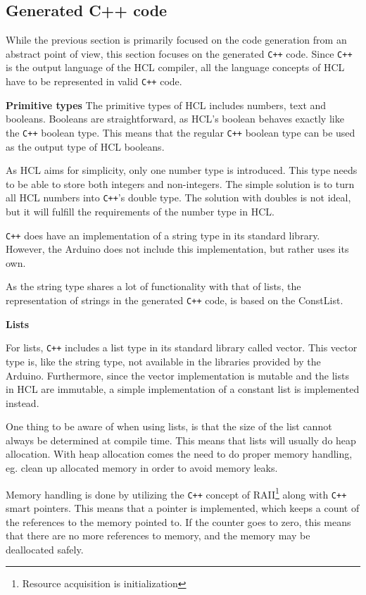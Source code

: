 
\subsection{Generated C++ code}
While the previous section is primarily focused on the code generation from an abstract point of view, this section focuses on the generated \texttt{C++} code.
Since \texttt{C++} is the output language of the HCL compiler, all the language concepts of HCL have to be represented in valid \texttt{C++} code.

\textbf{Primitive types}
The primitive types of HCL includes numbers, text and booleans. 
Booleans are straightforward, as HCL's boolean behaves exactly like the \texttt{C++} boolean type.
This means that the regular \texttt{C++} boolean type can be used as the output type of HCL booleans.

As HCL aims for simplicity, only one number type is introduced. 
This type needs to be able to store both integers and non-integers. 
The simple solution is to turn all HCL numbers into \texttt{C++}'s double type.
The solution with doubles is not ideal, but it will fulfill the requirements of the number type in HCL.

\texttt{C++} does have an implementation of a string type in its standard library.
However, the Arduino does not include this implementation, but rather uses its own.

As the string type shares a lot of functionality with that of lists, the representation of strings in the generated \texttt{C++} code, is based on the ConstList.

\textbf{Lists}

For lists, \texttt{C++} includes a list type in its standard library called vector. 
This vector type is, like the string type, not available in the libraries provided by the Arduino.
Furthermore, since the vector implementation is mutable and the lists in HCL are immutable, a simple implementation of a constant list is implemented instead.

One thing to be aware of when using lists, is that the size of the list cannot always be determined at compile time.
This means that lists will usually do heap allocation. 
With heap allocation comes the need to do proper memory handling, eg.
clean up allocated memory in order to avoid memory leaks.

Memory handling is done by utilizing the \texttt{C++} concept of RAII\footnote{Resource acquisition is initialization} along with \texttt{C++} smart pointers.
This means that a pointer is implemented, which keeps a count of the references to the memory pointed to.
If the counter goes to zero, this means that there are no more references to memory, and the memory may be deallocated safely.

